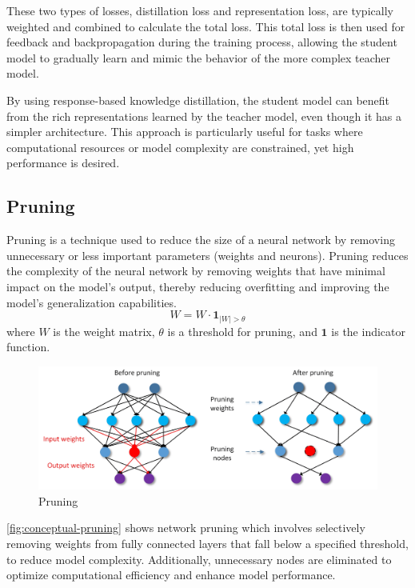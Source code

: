 \documentclass{ioereport}
\begin{document}
    These two types of losses, distillation loss and representation loss, are typically weighted and combined to calculate the total loss. This total loss is then used for feedback and backpropagation during the training process, allowing the student model to gradually learn and mimic the behavior of the more complex teacher model.
    
    By using response-based knowledge distillation, the student model can benefit from the rich representations learned by the teacher model, even though it has a simpler architecture. This approach is particularly useful for tasks where computational resources or model complexity are constrained, yet high performance is desired.

    \subsection{Pruning}
    Pruning is a technique used to reduce the size of a neural network by removing unnecessary or less important parameters (weights and neurons). Pruning reduces the complexity of the neural network by removing weights that have minimal impact on the model’s output, thereby reducing overfitting and improving the model's generalization capabilities.
    \begin{equation}
        W = W \cdot \mathbf{1}_{|W| > \theta}
    \end{equation}
    where \( W \) is the weight matrix, \( \theta \) is a threshold for pruning, and \( \mathbf{1} \) is the indicator function.

    \begin{figure}[H]
            \centering
            \includegraphics[width=\linewidth]{assets/conceptual figure of pruning.png}
            \caption{Pruning}
            \label{fig:conceptual-pruning}
    \end{figure}
    \autoref{fig:conceptual-pruning} shows network pruning which involves selectively removing weights from fully connected layers that fall below a specified threshold, to reduce model complexity. Additionally, unnecessary nodes are eliminated to optimize computational efficiency and enhance model performance.
    
\end{document}
